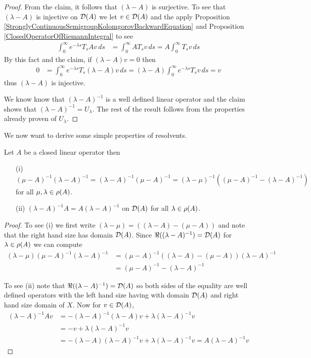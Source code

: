 \begin{proof}
From the claim, it follows that $(\lambda -A)$ is surjective.  To see that $(\lambda -A)$ is injective on $\mathcal{D}(A)$ we let $v \in \mathcal{D}(A)$ and the apply Proposition \ref{StronglyContinuousSemigroupKolomgorovBackwardEquation} and Proposition \ref{ClosedOperatorOfRiemannIntegral} to see
\begin{align*}
\int_0^\infty e^{-\lambda s} T_s A v \, ds &= \int_0^\infty A T_s v \, ds = A \int_0^\infty T_s v \, ds 
\end{align*}
By this fact and the claim, if $(\lambda - A)v = 0$ then
\begin{align*}
0 &= \int_0^\infty e^{-\lambda s} T_s (\lambda - A) v \, ds = (\lambda - A) \int_0^\infty e^{-\lambda s} T_s v \, ds = v
\end{align*}
thus $(\lambda - A)$ is injective.

We know know that $(\lambda -A)^{-1}$ is a well defined linear operator and the claim shows that $(\lambda -A)^{-1} = U_\lambda$.  The rest of the result follows from the properties already proven of $U_\lambda$.
\end{proof}

We now want to derive some simple properties of resolvents.
\begin{prop}\label{SimplePropertiesOfResolvents}Let $A$ be a closed linear operator then
\begin{itemize}
\item[(i)]$(\mu - A)^{-1}(\lambda -A)^{-1} = (\lambda - A)^{-1}(\mu -A)^{-1} = (\lambda - \mu)^{-1}\left( (\mu - A)^{-1} - (\lambda -A)^{-1}\right)$ for all $\mu, \lambda \in \rho(A)$. 
\item[(ii)] $(\lambda -A)^{-1} A = A (\lambda -A)^{-1}$ on $\mathcal{D}(A)$ for all $\lambda \in \rho(A)$.
\end{itemize}
\end{prop}
\begin{proof}
To see (i) we first write $(\lambda - \mu) = ((\lambda - A) - (\mu - A))$ and note that the right hand size has domain $\mathcal{D}(A)$.  Since $\Re((\lambda - A)^{-1}) = \mathcal{D}(A)$ for $\lambda \in \rho(A)$ we can compute
\begin{align*}
(\lambda - \mu) (\mu - A)^{-1}(\lambda -A)^{-1} &= (\mu - A)^{-1}((\lambda - A) - (\mu - A)) (\lambda -A)^{-1} \\
&= (\mu - A)^{-1} - (\lambda - A)^{-1}
\end{align*}

To see (ii) note that $\Re((\lambda -A)^{-1}) = \mathcal{D}(A)$ so both sides of the equality are well defined operators with the left hand size having with domain $\mathcal{D}(A)$ and right hand size domain of $X$.  Now
for $v \in \mathcal{D}(A)$, 
\begin{align*}
(\lambda -A)^{-1} A v &= - (\lambda -A)^{-1} (\lambda - A) v + \lambda  (\lambda -A)^{-1} v \\
&= -v + \lambda  (\lambda -A)^{-1} v \\
&=- (\lambda - A) (\lambda -A)^{-1} v + \lambda  (\lambda -A)^{-1} v = A (\lambda -A)^{-1} v
\end{align*}
\end{proof}

